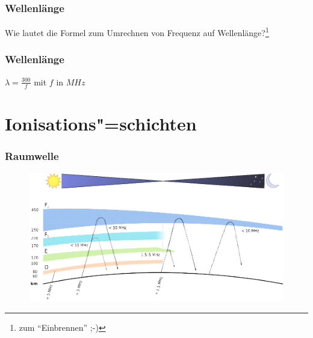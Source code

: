 
\begin{frame}
  \frametitle{Wellenlänge}
  \begin{center}
    \huge Wie lautet die Formel zum Umrechnen von Frequenz auf
    Wellenlänge?\footnote{zum ``Einbrennen'' ;-)}
  \end{center}
\end{frame}

\begin{frame}
  \frametitle{Wellenlänge}
  \begin{center}
    \huge $\lambda = \frac{300}{f}$ mit $f$ in $MHz$
  \end{center}
\end{frame}

\section*{Ionisations"=schichten}

\begin{frame}
  \frametitle{Raumwelle}
  \begin{center}
    \begin{figure}
      \includegraphics[width=.9\textwidth,height=.85\textheight,keepaspectratio]{a08/schichten_behelf_43.png}
    \end{figure}
  \end{center}
\end{frame}

